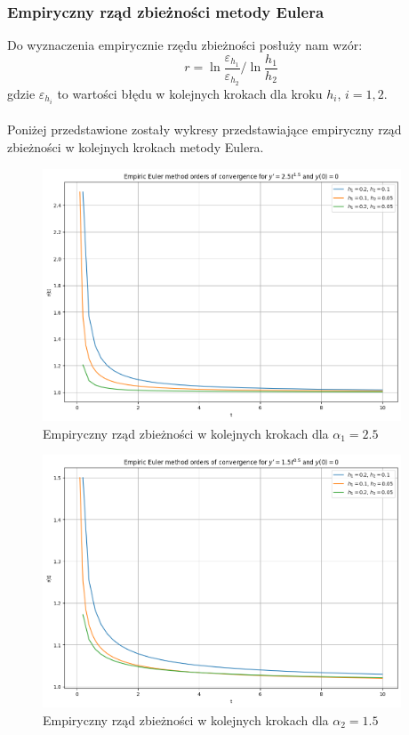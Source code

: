 \documentclass{article}
\begin{document}
\subsubsection{Empiryczny rząd zbieżności metody Eulera}
Do wyznaczenia empirycznie rzędu zbieżności posłuży nam wzór:
$$r = \ln{\frac{\varepsilon_{h_1}}{\varepsilon_{h_2}}} / \ln{\frac{h_1}{h_2}}$$
gdzie $\varepsilon_{h_i}$ to wartości błędu w kolejnych krokach dla kroku $h_i$, $i=1,2$.
\\\\
Poniżej przedstawione zostały wykresy przedstawiające empiryczny rząd zbieżności w kolejnych krokach metody Eulera.
\begin{figure}[H]
    \centering
    \includegraphics[width=0.95\textwidth]{4}
    \caption{Empiryczny rząd zbieżności w kolejnych krokach dla $\alpha_1 = 2.5$}
    \label{fig:mesh}
\end{figure}
\begin{figure}[H]
    \centering
    \includegraphics[width=0.95\textwidth]{5}
    \caption{Empiryczny rząd zbieżności w kolejnych krokach dla $\alpha_2 = 1.5$}
    \label{fig:mesh}
\end{figure}
\end{document}
